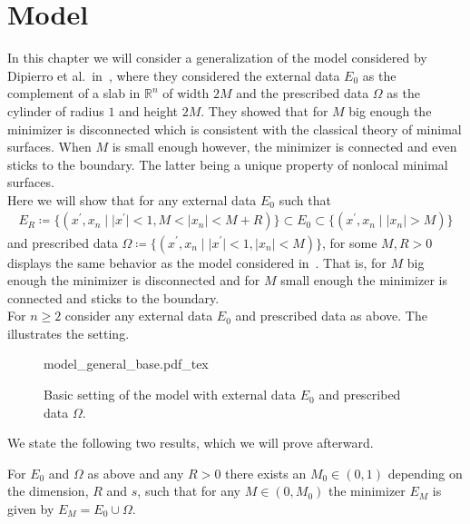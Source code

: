 \chapter{Model}
\label{ch:models}

In this chapter we will consider a generalization of the model considered by Dipierro et al.\
in~\cite{dipierro2020disconnectedness}, where they considered the external data \( E_0 \) as the
complement of a slab in \( \mathbb{R}^n \) of width \( 2M \) and the prescribed data \( \Omega \) as
the cylinder of radius \( 1 \) and height \( 2M \). They showed that for \( M \) big enough the
minimizer is disconnected which is consistent with the classical theory of minimal surfaces. When \(
M \) is small enough however, the minimizer is connected and even sticks to the boundary. The latter
being a unique property of nonlocal minimal surfaces. \\

Here we will show that for any external data \( E_0 \) such that
\begin{gather*}
	E_R \coloneqq \{(x^\prime, x_n \mid \lvert x^\prime \rvert < 1, M < \lvert x_n \rvert < M + R) \} \subset E_0 \subset \{(x^\prime, x_n \mid \lvert x_n \rvert > M) \}
\end{gather*}
and prescribed data \( \Omega \coloneqq \{(x^\prime, x_n \mid \lvert x^\prime \rvert < 1, \lvert x_n
\rvert < M) \} \), for some \( M, R > 0 \) displays the same behavior as the model considered
in~\cite{dipierro2020disconnectedness}. That is, for \( M \) big enough the minimizer is
disconnected and for \( M \) small enough the minimizer is connected and sticks to the boundary. \\

For \( n \geq 2 \) consider any external data \( E_0 \) and prescribed data as above. The
\Cref{fig:101} illustrates the setting.

\begin{figure}[ht]
	\centering
	\def\svgscale{1}
	{model_general_base.pdf_tex}
	\caption{Basic setting of the model with external data \( E_0 \) and prescribed data \( \Omega \).}
	\label{fig:101}
\end{figure}


We state the following two results, which we will prove afterward.

\begin{theorem}
	\label{thm:101}
	For \( E_0 \) and \( \Omega \) as above and any \( R > 0 \) there exists an \( M_0 \in (0, 1) \)
	depending on the dimension, \( R \) and \( s \), such that for any \( M \in (0, M_0) \) the
	minimizer \( E_M \) is given by \( E_M = E_0 \cup \Omega \).
\end{theorem}

